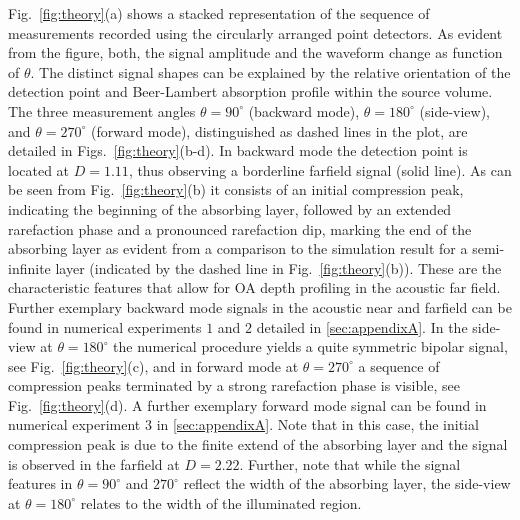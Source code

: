 \documentclass[12pt]{iopart}
\begin{document}
Fig.\ \ref{fig:theory}(a) shows a stacked representation of the sequence of
measurements recorded using the circularly arranged point detectors. As evident
from the figure, both, the signal amplitude and the waveform change as function
of $\theta$. The distinct signal shapes can be explained by the relative
orientation of the detection point and Beer-Lambert absorption profile within
the source volume. The three measurement angles $\theta=90^{\circ}$ (backward mode),
$\theta=180^{\circ}$ (side-view), and $\theta=270^{\circ}$ (forward mode), distinguished as
dashed lines in the plot, are detailed in Figs.\ \ref{fig:theory}(b-d).  In
backward mode the detection point is located at $D=1.11$, thus observing a
borderline farfield signal (solid line).  As can be seen from Fig.\
\ref{fig:theory}(b) it consists of an initial compression peak, indicating the
beginning of the absorbing layer, followed by an extended rarefaction phase and
a pronounced rarefaction dip, marking the end of the absorbing layer as evident
from a comparison to the simulation result for a semi-infinite layer (indicated
by the dashed line in Fig.\ \ref{fig:theory}(b)). These are the characteristic
features that allow for OA depth profiling in the acoustic far field. Further
exemplary backward mode signals in the acoustic near and farfield can be found
in numerical experiments $1$ and $2$ detailed in \ref{sec:appendixA}. In the
side-view at $\theta=180^{\circ}$ the numerical procedure yields a quite symmetric
bipolar signal, see Fig.\ \ref{fig:theory}(c), and in forward mode at
$\theta=270^{\circ}$ a sequence of compression peaks terminated by a strong rarefaction
phase is visible, see Fig.\ \ref{fig:theory}(d). A further exemplary forward
mode signal can be found in numerical experiment $3$ in \ref{sec:appendixA}.
Note that in this case, the initial compression peak is due to the finite
extend of the absorbing layer and the signal is observed in the farfield at
$D=2.22$.  Further, note that while the signal features in $\theta=90^{\circ}$ and
$270^{\circ}$ reflect the width of the absorbing layer, the side-view at $\theta=180^{\circ}$
relates to the width of the illuminated region.
\end{document}
